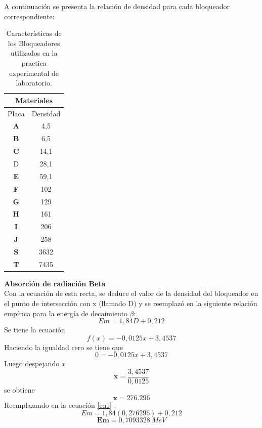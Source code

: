 \documentclass{article}									%
\begin{document}
$$$$
A continuación se presenta la relación de densidad para cada bloqueador correspondiente:
\begin{table}[H]
\centering
\begin{tabular}{|c|c|}
\hline
\multicolumn{2}{|c|}{\textbf{Materiales}} \\ \hline
Placa                & Densidad           \\ \hline
\textbf{A}           & 4,5                \\ \hline
\textbf{B}           & 6,5                \\ \hline
\textbf{C}           & 14,1               \\ \hline
D                    & 28,1               \\ \hline
\textbf{E}           & 59,1               \\ \hline
\textbf{F}           & 102                \\ \hline
\textbf{G}           & 129                \\ \hline
\textbf{H}           & 161                \\ \hline
\textbf{I}           & 206                \\ \hline
\textbf{J}           & 258                \\ \hline
\textbf{S}           & 3632               \\ \hline
\textbf{T}           & 7435               \\ \hline
\end{tabular}
\caption{Características de los Bloqueadores utilizados en la practica experimental de laboratorio.}
\label{my-label}
\end{table}
\textbf{Absorción de radiación Beta}\\
Con la ecuación de esta recta, se deduce el valor de la densidad del bloqueador en el punto de intersección con x (llamado D) y se reemplazó en la siguiente relación empírica para la energía de decaimiento $\beta$:
\begin{equation}
Em=1,84D+0,212
\label{eq1}
\end{equation}
Se tiene la ecuación 
$$f(x)=-0,0125x+3,4537$$
Haciendo la igualdad cero se tiene que $$0=-0,0125x + 3,4537$$Luego despejando $x$
$$\textbf{x}=\frac{3,4537}{0,0125}$$ se obtiene$$\textbf{x}=276.296$$Reemplazando en la ecuación \ref{eq1} :
\begin{equation}
Em=1,84(0,276296)+0,212
\label{eq2}
\end{equation}
\begin{equation}
  \textbf{Em}=0,7093328  \ MeV 
\label{eq3}
\end{equation}
\end{document}
